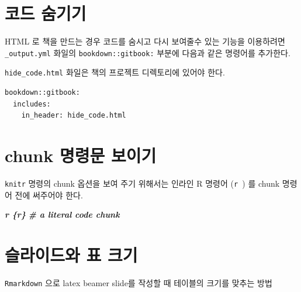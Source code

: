 \documentclass[
]{book}
\newenvironment{Shaded}{\begin{snugshade}}{\end{snugshade}}
\newcommand{\InformationTok}[1]{\textcolor[rgb]{0.56,0.35,0.01}{\textbf{\textit{#1}}}}
\theoremstyle{definition}
\theoremstyle{definition}
\theoremstyle{definition}
\theoremstyle{definition}
\theoremstyle{remark}
\begin{document}
\hypertarget{uxcf54uxb4dc-uxc228uxae30uxae30}{%
\section{코드 숨기기}\label{uxcf54uxb4dc-uxc228uxae30uxae30}}

HTML 로 책을 만드는 경우 코드를 숨시고 다시 보여줄수 있는 기능을 이용하려면 \texttt{\_output.yml} 화일의
\texttt{bookdown::gitbook:} 부분에 다음과 같은 명령어를 추가한다.

\texttt{hide\_code.html} 화일은 책의 프로젝트 디렉토리에 있어야 한다.

\begin{verbatim}
bookdown::gitbook:
  includes:
    in_header: hide_code.html 
\end{verbatim}

\hypertarget{chunk-uxba85uxb839uxbb38-uxbcf4uxc774uxae30}{%
\section{chunk 명령문 보이기}\label{chunk-uxba85uxb839uxbb38-uxbcf4uxc774uxae30}}

\texttt{knitr} 명령의 chunk 옵션을 보여 주기 위해서는 인라인 R 명령어 (\texttt{\textasciigrave{}r\ \textquotesingle{}\textquotesingle{}\textasciigrave{}}) 를
chunk 명령어 전에 써주어야 한다.

\begin{Shaded}
\begin{Highlighting}[]
\InformationTok{\textasciigrave{}\textasciigrave{}\textasciigrave{}\textasciigrave{}}
\InformationTok{\textasciigrave{}r \textquotesingle{}\textquotesingle{}\textasciigrave{}\textasciigrave{}\textasciigrave{}\textasciigrave{}\{r\}}
\InformationTok{\# a literal code chunk}
\InformationTok{\textasciigrave{}\textasciigrave{}\textasciigrave{}}
\InformationTok{\textasciigrave{}\textasciigrave{}\textasciigrave{}\textasciigrave{}}
\end{Highlighting}
\end{Shaded}

\hypertarget{uxc2acuxb77cuxc774uxb4dcuxc640-uxd45c-uxd06cuxae30}{%
\section{슬라이드와 표 크기}\label{uxc2acuxb77cuxc774uxb4dcuxc640-uxd45c-uxd06cuxae30}}

\texttt{Rmarkdown} 으로 latex beamer slide를 작성할 때 테이블의 크기를 맞추는 방법
\end{document}
